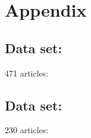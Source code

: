 \chapter{Appendix}


\section{Data set: }\label{sec:conflictsraw}
\begin{multicols}{3}\tiny
471 articles:\\

\end{multicols}

\clearpage
\section{Data set: }\label{sec:conflicts}

\begin{multicols}{3}\tiny
230 articles:\\

\end{multicols}

%
%
%
%
%
